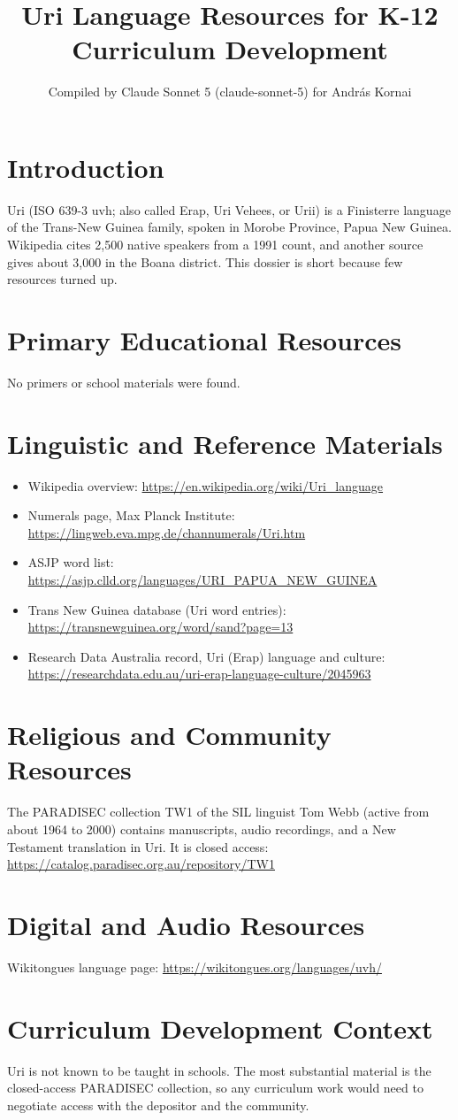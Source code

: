 \documentclass[12pt]{article}
\title{Uri Language Resources for K-12 Curriculum Development}
\author{Compiled by Claude Sonnet 5 (claude-sonnet-5) for Andr\'as Kornai}
\date{}
\begin{document}
\maketitle

\section{Introduction}
Uri (ISO 639-3 uvh; also called Erap, Uri Vehees, or Urii) is a Finisterre language of the Trans-New Guinea family, spoken in Morobe Province, Papua New Guinea. Wikipedia cites 2,500 native speakers from a 1991 count, and another source gives about 3,000 in the Boana district. This dossier is short because few resources turned up.

\section{Primary Educational Resources}
No primers or school materials were found.

\section{Linguistic and Reference Materials}
\begin{itemize}
\item Wikipedia overview: \url{https://en.wikipedia.org/wiki/Uri_language}
\item Numerals page, Max Planck Institute: \url{https://lingweb.eva.mpg.de/channumerals/Uri.htm}
\item ASJP word list: \url{https://asjp.clld.org/languages/URI_PAPUA_NEW_GUINEA}
\item Trans New Guinea database (Uri word entries): \url{https://transnewguinea.org/word/sand?page=13}
\item Research Data Australia record, Uri (Erap) language and culture: \url{https://researchdata.edu.au/uri-erap-language-culture/2045963}
\end{itemize}

\section{Religious and Community Resources}
The PARADISEC collection TW1 of the SIL linguist Tom Webb (active from about 1964 to 2000) contains manuscripts, audio recordings, and a New Testament translation in Uri. It is closed access: \url{https://catalog.paradisec.org.au/repository/TW1}

\section{Digital and Audio Resources}
Wikitongues language page: \url{https://wikitongues.org/languages/uvh/}

\section{Curriculum Development Context}
Uri is not known to be taught in schools. The most substantial material is the closed-access PARADISEC collection, so any curriculum work would need to negotiate access with the depositor and the community.
\end{document}
